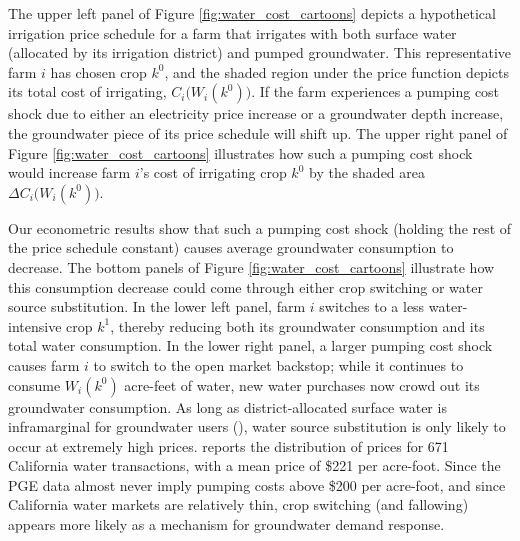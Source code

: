The upper left panel of Figure \ref{fig:water_cost_cartoons} depicts a hypothetical irrigation price schedule for a farm that irrigates with both surface water (allocated by its irrigation district) and pumped groundwater. This representative farm $i$ has chosen crop $k^0$, and the shaded region under the price function depicts its total cost of irrigating, $C_i\big(W_i(k^0)\big)$. If the farm experiences a pumping cost shock due to either an electricity price increase or a groundwater depth increase, the groundwater piece of its price schedule will shift up. The upper right panel of Figure \ref{fig:water_cost_cartoons} illustrates how such a pumping cost shock would increase farm $i$'s cost of irrigating crop $k^0$ by the shaded area $\Delta C_i\big(W_i(k^0)\big)$. 

Our econometric results show that such a pumping cost shock (holding the rest of the price schedule constant) causes average groundwater consumption to decrease. The bottom panels of Figure \ref{fig:water_cost_cartoons} illustrate how this consumption decrease could come through either crop switching or water source substitution. In the lower left panel, farm $i$ switches to a less water-intensive crop $k^1$, thereby reducing both its groundwater consumption and its total water consumption. In the lower right panel,  a larger  pumping cost shock causes farm $i$ to switch to the open market backstop; while it continues to consume $W_i(k^0)$ acre-feet of water, new water purchases now crowd out its groundwater consumption. As long as district-allocated surface water is inframarginal for groundwater users (\textcite{hagerty2019}), water source substitution is only likely to occur at extremely high prices. \textcite{hagerty2018} reports the distribution of prices for 671 California water transactions, with a mean price of \$221 per acre-foot. Since the PGE data almost never imply pumping costs above \$200 per acre-foot, and since California water markets are relatively thin, crop switching (and fallowing) appears more likely as a mechanism for groundwater demand response.


